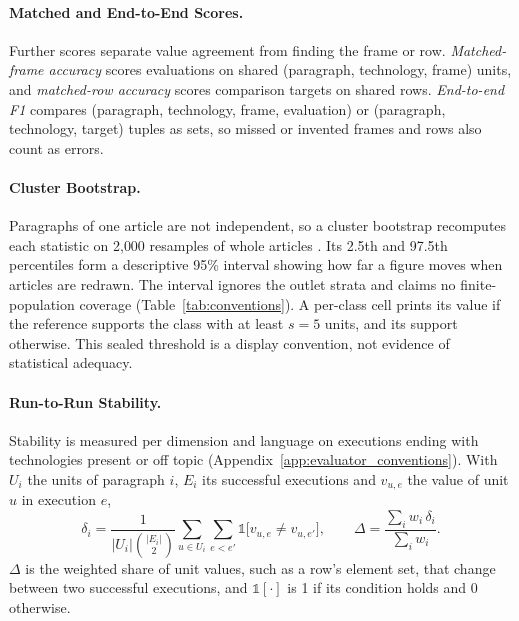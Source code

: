 \paragraph{Matched and End-to-End Scores.} Further scores separate value agreement from finding the frame or row. \emph{Matched-frame accuracy} scores evaluations on shared (paragraph, technology, frame) units, and \emph{matched-row accuracy} scores comparison targets on shared rows. \emph{End-to-end F1} compares (paragraph, technology, frame, evaluation) or (paragraph, technology, target) tuples as sets, so missed or invented frames and rows also count as errors.

\paragraph{Cluster Bootstrap.} Paragraphs of one article are not independent, so a cluster bootstrap recomputes each statistic on 2{,}000 resamples of whole articles \parencite[p.~370]{field2007bootstrapping}. Its 2.5th and 97.5th percentiles form a descriptive 95\% interval showing how far a figure moves when articles are redrawn. The interval ignores the outlet strata and claims no finite-population coverage (Table~\ref{tab:conventions}). A per-class cell prints its value if the reference supports the class with at least $s = 5$ units, and its support otherwise. This sealed threshold is a display convention, not evidence of statistical adequacy.

\paragraph{Run-to-Run Stability.} Stability is measured per dimension and language on executions ending with technologies present or off topic (Appendix~\ref{app:evaluator_conventions}). With $U_i$ the units of paragraph $i$, $E_i$ its successful executions and $v_{u,e}$ the value of unit $u$ in execution $e$,
\begin{equation}
\delta_i = \frac{1}{|U_i|\binom{|E_i|}{2}} \sum_{u \in U_i} \sum_{e < e'} \mathbb{1}\bigl[v_{u,e} \neq v_{u,e'}\bigr], \qquad
\Delta = \frac{\sum_i w_i\, \delta_i}{\sum_i w_i}.
\label{eq:stability}
\end{equation}
$\Delta$ is the weighted share of unit values, such as a row's element set, that change between two successful executions, and $\mathbb{1}[\cdot]$ is 1 if its condition holds and 0 otherwise.

